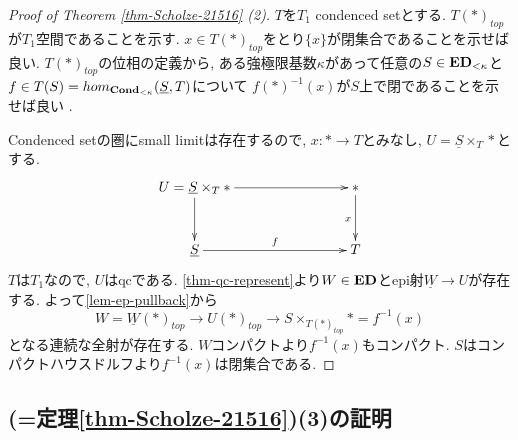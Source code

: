 \documentclass[dvipdfmx,a4paper,11pt]{article}
\theoremstyle{definition}
\begin{document}
\begin{proof}[Proof of Theorem \ref{thm-Scholze-21516} (2)]
$T$を$T_1$ condenced setとする. 
$T(\ast)_{top}$が$T_1$空間であることを示す.
$x \in T(\ast)_{top}$をとり$\{ x\}$が閉集合であることを示せば良い. 
$T(\ast)_{top}$の位相の定義から, ある強極限基数$\kappa$があって任意の$S \in {\bf ED}_{< \kappa}$と$f \in T(S) = hom_{{\bf Cond}_{< \kappa}}(\underline{S}, T)$について
$f(\ast)^{-1}(x)$が$S$上で閉であることを示せば良い .

Condenced setの圏にsmall limitは存在するので, $x : \ast \to T$とみなし, $U = \underline{S} \times_{T} \ast $とする. 
\begin{equation*}
\xymatrix@C=80pt@R=30pt{
U = \underline{S} \times_{T} \ast \ar@{->}[r]
\ar@{->}[d]
& \ast \ar@{->}[d]_{x}
\\
\underline{S} \ar@{->}[r]^{f}
&T
 \\   
}
\end{equation*}
$T$は$T_1$なので, $U$はqcである.
\ref{thm-qc-represent}より$W \in {\bf ED}$とepi射$\underline{W} \to U$が存在する.
よって\ref{lem-ep-pullback}から
$$
W=\underline{W}(\ast)_{top} \to U(\ast)_{top}
\to S \times_{T(\ast)_{top}} \ast = f^{-1}(x)
$$
となる連続な全射が存在する. 
$W$コンパクトより$f^{-1}(x)$もコンパクト. $S$はコンパクトハウスドルフより$f^{-1}(x)$は閉集合である. 
\end{proof}

\subsection{\cite[Proposition 2.15, Theorem 2.16]{Sch19}(=定理\ref{thm-Scholze-21516})(3)の証明}
\end{document}
